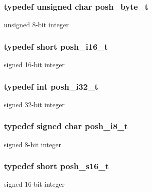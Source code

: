 \subsubsection[{\texorpdfstring{posh\+\_\+byte\+\_\+t}{posh_byte_t}}]{\setlength{\rightskip}{0pt plus 5cm}typedef unsigned char {\bf posh\+\_\+byte\+\_\+t}}\hypertarget{group__PoshTypes_ga3d52997a5402758b6d8cea03bb931f05}{}\label{group__PoshTypes_ga3d52997a5402758b6d8cea03bb931f05}
unsigned 8-\/bit integer 
\subsubsection[{\texorpdfstring{posh\+\_\+i16\+\_\+t}{posh_i16_t}}]{\setlength{\rightskip}{0pt plus 5cm}typedef short {\bf posh\+\_\+i16\+\_\+t}}\hypertarget{group__PoshTypes_ga264eadd7cae2a9268478671773189b4a}{}\label{group__PoshTypes_ga264eadd7cae2a9268478671773189b4a}
signed 16-\/bit integer 
\subsubsection[{\texorpdfstring{posh\+\_\+i32\+\_\+t}{posh_i32_t}}]{\setlength{\rightskip}{0pt plus 5cm}typedef int {\bf posh\+\_\+i32\+\_\+t}}\hypertarget{group__PoshTypes_gad70940538f6f13aff31955da2ceaa48b}{}\label{group__PoshTypes_gad70940538f6f13aff31955da2ceaa48b}
signed 32-\/bit integer 
\subsubsection[{\texorpdfstring{posh\+\_\+i8\+\_\+t}{posh_i8_t}}]{\setlength{\rightskip}{0pt plus 5cm}typedef signed char {\bf posh\+\_\+i8\+\_\+t}}\hypertarget{group__PoshTypes_ga7bbad3ba2e3a2ed629142c297c31ec04}{}\label{group__PoshTypes_ga7bbad3ba2e3a2ed629142c297c31ec04}
signed 8-\/bit integer 
\subsubsection[{\texorpdfstring{posh\+\_\+s16\+\_\+t}{posh_s16_t}}]{\setlength{\rightskip}{0pt plus 5cm}typedef short {\bf posh\+\_\+s16\+\_\+t}}\hypertarget{group__PoshTypes_gabb2c3e11f94548b8c3bc63fbbe7c2110}{}\label{group__PoshTypes_gabb2c3e11f94548b8c3bc63fbbe7c2110}
signed 16-\/bit integer 

